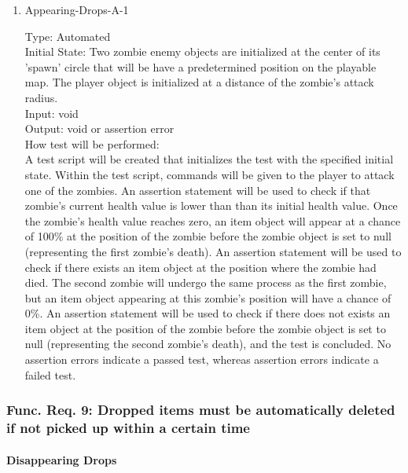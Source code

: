 \documentclass[12pt, titlepage]{article}
\begin{document}
\begin{enumerate}

\item{Appearing-Drops-A-1\\}

Type: Automated\\
					
Initial State: Two zombie enemy objects are initialized at the center of its 'spawn' circle that will be have a predetermined position on the playable map. The player object is initialized at a distance of the zombie's attack radius.\\
					
Input: void \\
					
Output: void or assertion error \\
					
How test will be performed:\\ A test script will be created that initializes the test with the specified initial state. Within the test script, commands will be given to the player to attack one of the zombies. An assertion statement will be used to check if that zombie's current health value is lower than than its initial health value. Once the zombie's health value reaches zero, an item object will appear at a chance of 100\% at the position of the zombie before the zombie object is set to null (representing the first zombie's death). An assertion statement will be used to check if there exists an item object at the position where the zombie had died. The second zombie will undergo the same process as the first zombie, but an item object appearing at this zombie's position will have a chance of 0\%. An assertion statement will be used to check if there does not exists an item object at the position of the zombie before the zombie object is set to null (representing the second zombie's death), and the test is concluded. No assertion errors indicate a passed test, whereas assertion errors indicate a failed test.\\

\end{enumerate}

\subsubsection{Func. Req. 9: Dropped items must be automatically deleted if not picked up within a certain time}

\paragraph{Disappearing Drops}
\end{document}
